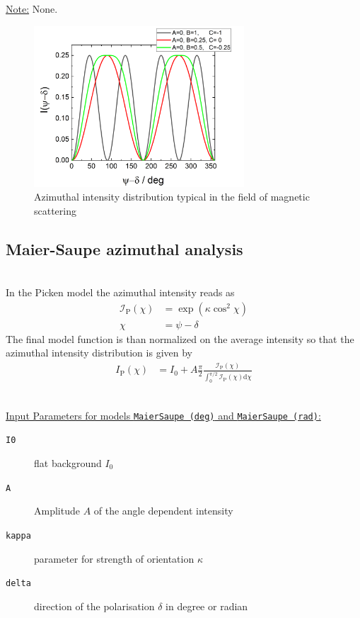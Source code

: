 \underline{Note:}
None.


\begin{figure}[htb]
\begin{center}
\includegraphics[width=0.7\textwidth]{../images/form_factor/azimuthal/sin2sin4.png}
\end{center}
\caption{Azimuthal intensity distribution typical in the field of magnetic scattering}
\label{fig:IQsin2sin4}
\end{figure}

\subsection{Maier-Saupe azimuthal analysis} ~\\
In the Picken model \cite{Picken1990,Fan1994,Makarova2013} the azimuthal intensity reads as
\begin{align}
  \mathcal{I}_\mathrm{P}(\chi) &= \exp\left(\kappa\cos^2\chi\right)\\
\chi &= \psi-\delta
\end{align}
The final model function is than normalized on the average intensity so that the azimuthal intensity distribution is given by
\begin{align}
  I_\mathrm{P}(\chi) &= I_0 + A \frac{\pi}{2}\frac{\mathcal{I}_\mathrm{P}(\chi)}{\int_0^{\pi/2}\mathcal{I}_\mathrm{P}(\chi)\mathrm{d}\chi}
\end{align}

\hspace{1pt}\\
\underline{Input Parameters for models \texttt{MaierSaupe (deg)} and \texttt{MaierSaupe (rad)}:}\\
\begin{description}
\item[\texttt{I0}] flat background $I_0$
\item[\texttt{A}] Amplitude $A$ of the angle dependent intensity
\item[\texttt{kappa}] parameter for strength of orientation $\kappa$
\item[\texttt{delta}] direction of the polarisation $\delta$ in degree or radian
\end{description}

